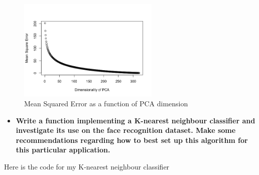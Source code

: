 \documentclass[12pt]{article}
\begin{document}
\begin{figure}[t!]
\caption{Mean Squared Error as a function of PCA dimension}
\centering
\includegraphics[width=0.6\textwidth]{mse}
\end{figure}
\begin{itemize}
\item \textbf{Write a function implementing a K-nearest neighbour classifier and investigate its use on the face recognition dataset. Make some recommendations regarding how to best set up this algorithm for this particular application.}
\end{itemize}
Here is the code for my K-nearest neighbour classifier 
\end{document}

